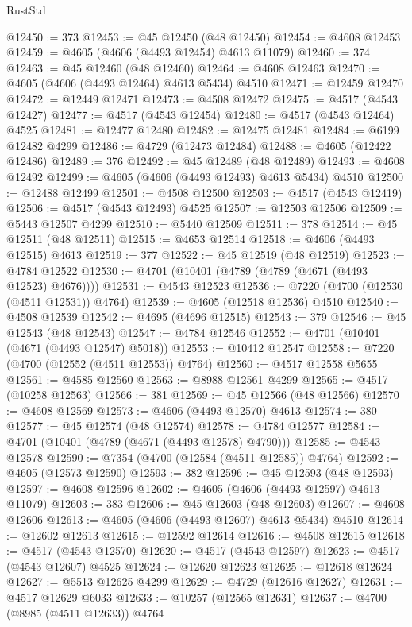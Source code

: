 \begin{lexlean}{RustStd}
\begin{coremodule}
@12450 := 373
@12453 := @45 @12450 (@48 @12450)
@12454 := @4608 @12453
@12459 := @4605 (@4606 (@4493 @12454) @4613 @11079)
@12460 := 374
@12463 := @45 @12460 (@48 @12460)
@12464 := @4608 @12463
@12470 := @4605 (@4606 (@4493 @12464) @4613 @5434) @4510
@12471 := @12459 @12470
@12472 := @12449 @12471
@12473 := @4508 @12472
@12475 := @4517 (@4543 @12427)
@12477 := @4517 (@4543 @12454)
@12480 := @4517 (@4543 @12464) @4525
@12481 := @12477 @12480
@12482 := @12475 @12481
@12484 := @6199 @12482 @4299
@12486 := @4729 (@12473 @12484)
@12488 := @4605 (@12422 @12486)
@12489 := 376
@12492 := @45 @12489 (@48 @12489)
@12493 := @4608 @12492
@12499 := @4605 (@4606 (@4493 @12493) @4613 @5434) @4510
@12500 := @12488 @12499
@12501 := @4508 @12500
@12503 := @4517 (@4543 @12419)
@12506 := @4517 (@4543 @12493) @4525
@12507 := @12503 @12506
@12509 := @5443 @12507 @4299
@12510 := @5440 @12509
@12511 := 378
@12514 := @45 @12511 (@48 @12511)
@12515 := @4653 @12514
@12518 := @4606 (@4493 @12515) @4613
@12519 := 377
@12522 := @45 @12519 (@48 @12519)
@12523 := @4784 @12522
@12530 := @4701 (@10401 (@4789 (@4789 (@4671 (@4493 @12523) @4676))))
@12531 := @4543 @12523
@12536 := @7220 (@4700 (@12530 (@4511 @12531)) @4764)
@12539 := @4605 (@12518 @12536) @4510
@12540 := @4508 @12539
@12542 := @4695 (@4696 @12515)
@12543 := 379
@12546 := @45 @12543 (@48 @12543)
@12547 := @4784 @12546
@12552 := @4701 (@10401 (@4671 (@4493 @12547) @5018))
@12553 := @10412 @12547
@12558 := @7220 (@4700 (@12552 (@4511 @12553)) @4764)
@12560 := @4517 @12558 @5655
@12561 := @4585 @12560
@12563 := @8988 @12561 @4299
@12565 := @4517 (@10258 @12563)
@12566 := 381
@12569 := @45 @12566 (@48 @12566)
@12570 := @4608 @12569
@12573 := @4606 (@4493 @12570) @4613
@12574 := 380
@12577 := @45 @12574 (@48 @12574)
@12578 := @4784 @12577
@12584 := @4701 (@10401 (@4789 (@4671 (@4493 @12578) @4790)))
@12585 := @4543 @12578
@12590 := @7354 (@4700 (@12584 (@4511 @12585)) @4764)
@12592 := @4605 (@12573 @12590)
@12593 := 382
@12596 := @45 @12593 (@48 @12593)
@12597 := @4608 @12596
@12602 := @4605 (@4606 (@4493 @12597) @4613 @11079)
@12603 := 383
@12606 := @45 @12603 (@48 @12603)
@12607 := @4608 @12606
@12613 := @4605 (@4606 (@4493 @12607) @4613 @5434) @4510
@12614 := @12602 @12613
@12615 := @12592 @12614
@12616 := @4508 @12615
@12618 := @4517 (@4543 @12570)
@12620 := @4517 (@4543 @12597)
@12623 := @4517 (@4543 @12607) @4525
@12624 := @12620 @12623
@12625 := @12618 @12624
@12627 := @5513 @12625 @4299
@12629 := @4729 (@12616 @12627)
@12631 := @4517 @12629 @6033
@12633 := @10257 (@12565 @12631)
@12637 := @4700 (@8985 (@4511 @12633)) @4764

\end{coremodule}
\end{lexlean}
